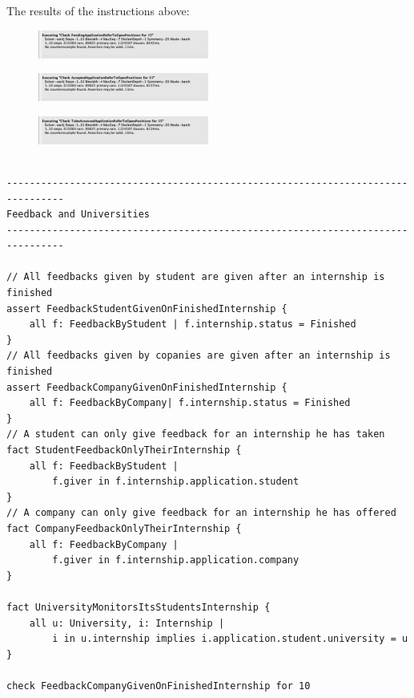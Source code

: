 The results of the instructions above:
\begin{figure}[h!]
    \centering\includegraphics[width=0.5\textwidth]{RASD/Images/Alloy/checkPendingApplicationsReferToOpenPositions.png}
    \label{fig:checkPendingApplicationsReferToOpenPositions}
\end{figure}
\begin{figure}[h!]
    \centering\includegraphics[width=0.5\textwidth]{RASD/Images/Alloy/checkAcceptedApplicationReferToOpenPositions.png}
    \label{fig:checkAcceptedApplicationReferToOpenPositions}
\end{figure}
\begin{figure}[h!]
    \centering\includegraphics[width=0.5\textwidth]{RASD/Images/Alloy/checkTobeAssessedApplicationReferToOpenPositions.png}
    \label{fig:TobeAssessedApplicationReferToOpenPositions}
\end{figure}


\begin{verbatim}

--------------------------------------------------------------------------------
Feedback and Universities
--------------------------------------------------------------------------------

// All feedbacks given by student are given after an internship is finished
assert FeedbackStudentGivenOnFinishedInternship {
    all f: FeedbackByStudent | f.internship.status = Finished
}
// All feedbacks given by copanies are given after an internship is finished
assert FeedbackCompanyGivenOnFinishedInternship {
    all f: FeedbackByCompany| f.internship.status = Finished
}
// A student can only give feedback for an internship he has taken
fact StudentFeedbackOnlyTheirInternship {
    all f: FeedbackByStudent | 
        f.giver in f.internship.application.student
}
// A company can only give feedback for an internship he has offered
fact CompanyFeedbackOnlyTheirInternship {
    all f: FeedbackByCompany | 
        f.giver in f.internship.application.company
}

fact UniversityMonitorsItsStudentsInternship {
    all u: University, i: Internship | 
        i in u.internship implies i.application.student.university = u
}

check FeedbackCompanyGivenOnFinishedInternship for 10

\end{verbatim}

